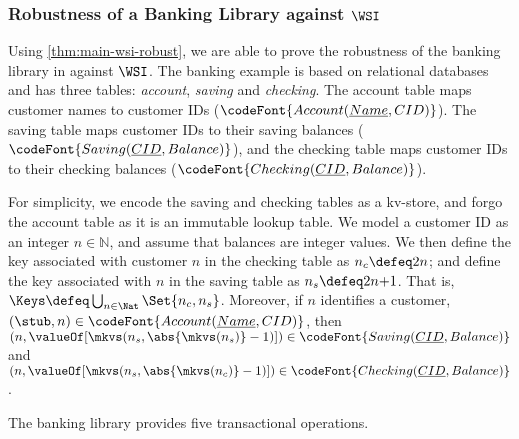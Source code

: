 \subsubsection{Robustness of a Banking Library against $\WSI$}

Using \cref{thm:main-wsi-robust},
we are able to prove the robustness of the banking library in \citet{bank-example-wsi} against \( \WSI \).
The banking example is based on relational databases and has three tables: \emph{account}, \emph{saving} and \emph{checking}.
The account table maps customer names to customer IDs (\( \codeFont{Account(\underline{Name}, CID )} \)).
The saving table maps customer IDs to their saving balances (\( \codeFont{Saving(\underline{CID}, Balance )} \)), and
the checking table maps customer IDs to their checking balances (\( \codeFont{Checking(\underline{CID}, Balance )} \)).

For simplicity, we encode the saving and checking tables as a kv-store,
and forgo the account table as it is an immutable lookup table.
We model a customer ID as an integer \( n \in \mathbb{N}\), and assume that balances are integer values. 
We then define the key associated with customer $n$ in the checking table as 
$n_c \defeq 2 n$; 
and define the key associated with $n$ in the saving table as 
$n_s \defeq 2n {+} 1$. 
That is, \( \Keys \defeq \bigcup_{n \in \Nat} \Set{n_c, n_s} \).
Moreover, if \( n \) identifies a customer, \ie $(\stub, n) \in \codeFont{Account(\underline{Name}, CID )}$,
then
\( (n, \valueOf[\mkvs(n_s, \abs{\mkvs(n_s)} - 1)]) \in \codeFont{Saving(\underline{CID}, Balance )} \)
and \( (n, \valueOf[\mkvs(n_s, \abs{\mkvs(n_c)} - 1)]) \in \codeFont{Checking(\underline{CID}, Balance )} \).

The banking library provides five transactional operations.%

